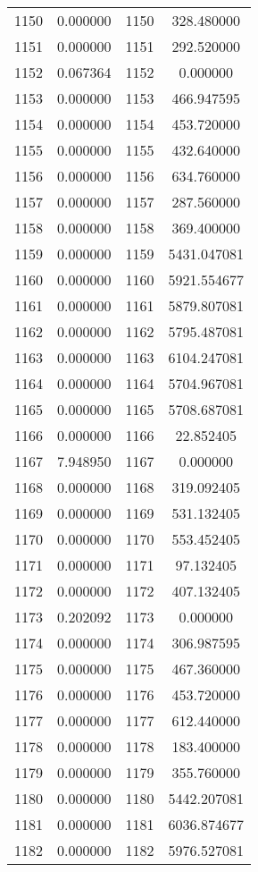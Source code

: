 \documentclass[12pt]{article}
\begin{document}
\begin{longtable}{@{}cccc@{}}
1150 & 0.000000 & 1150 & 328.480000 \\
1151 & 0.000000 & 1151 & 292.520000 \\
1152 & 0.067364 & 1152 & 0.000000 \\
1153 & 0.000000 & 1153 & 466.947595 \\
1154 & 0.000000 & 1154 & 453.720000 \\
1155 & 0.000000 & 1155 & 432.640000 \\
1156 & 0.000000 & 1156 & 634.760000 \\
1157 & 0.000000 & 1157 & 287.560000 \\
1158 & 0.000000 & 1158 & 369.400000 \\
1159 & 0.000000 & 1159 & 5431.047081 \\
1160 & 0.000000 & 1160 & 5921.554677 \\
1161 & 0.000000 & 1161 & 5879.807081 \\
1162 & 0.000000 & 1162 & 5795.487081 \\
1163 & 0.000000 & 1163 & 6104.247081 \\
1164 & 0.000000 & 1164 & 5704.967081 \\
1165 & 0.000000 & 1165 & 5708.687081 \\
1166 & 0.000000 & 1166 & 22.852405 \\
1167 & 7.948950 & 1167 & 0.000000 \\
1168 & 0.000000 & 1168 & 319.092405 \\
1169 & 0.000000 & 1169 & 531.132405 \\
1170 & 0.000000 & 1170 & 553.452405 \\
1171 & 0.000000 & 1171 & 97.132405 \\
1172 & 0.000000 & 1172 & 407.132405 \\
1173 & 0.202092 & 1173 & 0.000000 \\
1174 & 0.000000 & 1174 & 306.987595 \\
1175 & 0.000000 & 1175 & 467.360000 \\
1176 & 0.000000 & 1176 & 453.720000 \\
1177 & 0.000000 & 1177 & 612.440000 \\
1178 & 0.000000 & 1178 & 183.400000 \\
1179 & 0.000000 & 1179 & 355.760000 \\
1180 & 0.000000 & 1180 & 5442.207081 \\
1181 & 0.000000 & 1181 & 6036.874677 \\
1182 & 0.000000 & 1182 & 5976.527081 \\

\end{longtable}
\end{document}
